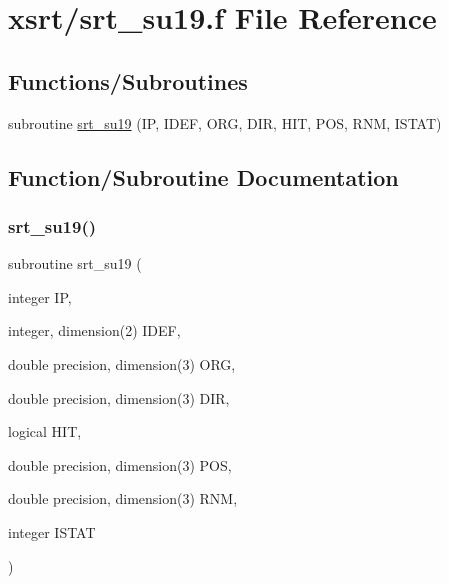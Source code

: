 \hypertarget{srt__su19_8f}{}\section{xsrt/srt\+\_\+su19.f File Reference}
\label{srt__su19_8f}
\subsection*{Functions/\+Subroutines}
\begin{DoxyCompactItemize}
\item 
subroutine \hyperlink{srt__su19_8f_aa2ecca9f940ee0de394b80c40e6ff91f}{srt\+\_\+su19} (IP, I\+D\+EF, O\+RG, D\+IR, H\+IT, P\+OS, R\+NM, I\+S\+T\+AT)
\end{DoxyCompactItemize}


\subsection{Function/\+Subroutine Documentation}
\mbox{\label{srt__su19_8f_aa2ecca9f940ee0de394b80c40e6ff91f}} 
\subsubsection{\texorpdfstring{srt\+\_\+su19()}{srt\_su19()}}
{\footnotesize\ttfamily subroutine srt\+\_\+su19 (\begin{DoxyParamCaption}\item[{integer}]{IP,  }\item[{integer, dimension(2)}]{I\+D\+EF,  }\item[{double precision, dimension(3)}]{O\+RG,  }\item[{double precision, dimension(3)}]{D\+IR,  }\item[{logical}]{H\+IT,  }\item[{double precision, dimension(3)}]{P\+OS,  }\item[{double precision, dimension(3)}]{R\+NM,  }\item[{integer}]{I\+S\+T\+AT }\end{DoxyParamCaption})}

